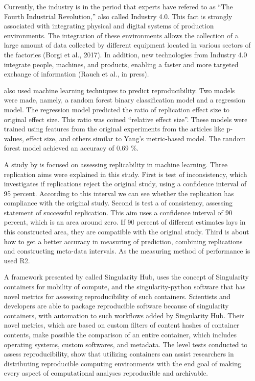 \documentclass[
10pt, %
a4paper, %
oneside, %
headinclude,footinclude, %
BCOR5mm, %
]{scrartcl}
\begin{document}
Currently, the industry is in the period that experts have refered to as “The Fourth Industrial Revolution,” also called Industry 4.0. This fact is strongly associated with integrating physical and digital systems of production environments. The integration of these environments allows the collection of a large amount of data collected by different equipment located in various sectors of the factories (Borgi et al., 2017). In addition, new technologies from Industry 4.0 integrate people, machines, and products, enabling a faster and more targeted exchange of information (Rauch et al., in press).

\cite{Altmejd2019} also used machine learning techniques to predict reproducibility. 
Two models were made, namely, a random forest binary classification model and a regression model. 
The regression model predicted the ratio of replication effect size to original effect size. 
This ratio was coined “relative effect size”. 
These models were trained using features from the original experiments from the articles like p-values, effect size, and others similar to Yang's metric-based model. 
The random forest model achieved an accuracy of 0.69 \%. 

A study by \cite{Vijaykumar2019} is focused on assessing replicability in machine learning. Three replication aims were explained in this study. First is test of inconsistency, which investigates if replications reject the original study, using a confidence interval of 95 percent. According to this interval we can see whether the replication has compliance with the original study. 
Second is test a of consistency, assessing statement of successful replication. This aim uses a confidence interval of 90 percent, which is an area around zero. If 90 percent of different estimates lays in this constructed area, they are compatible with the original study. 
Third is about how to get a better accuracy in measuring of prediction, combining replications and constructing meta-data intervals. 
As the measuring method of performance is used R2. 


A framework presented by \cite{Sochat2017} called Singularity Hub, uses the concept of Singularity containers for mobility of compute, and the singularity-python software that has novel metrics for assessing reproducibility of such containers. Scientists and developers are able to package reproducible software because of singularity containers, with automation to such workflows added by Singularity Hub. Their novel metrics, which are based on custom filters of content hashes of container contents, make possible the comparison of an entire container, which includes operating systems, custom softwares, and metadata. The level tests conducted to assess reproducibility, show that utilizing containers can assist researchers in distributing reproducible computing environments with the end goal of making every aspect of computational analyses reproducible and archivable. 
\end{document}
